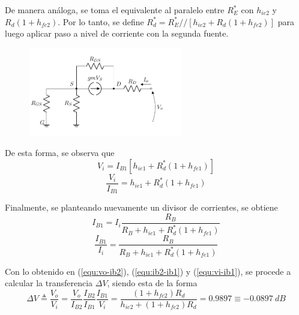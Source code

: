 De manera análoga, se toma el equivalente al paralelo entre $R_{E}^*$ con $h_{ie2}$ y $R_d \left( 1 + h_{fe2} \right)$. Por lo tanto, se define $R_{d}^* = R_{E}^* // \left[ h_{ie2} + R_d \left( 1 + h_{fe2} \right) \right]$ para luego aplicar paso a nivel de corriente con la segunda fuente.
\begin{figure}[H]
\centering
	\includegraphics[width=0.6\textwidth, page=6]{Imagenes/ModeloIncremental.pdf}
\end{figure}

De esta forma, se observa que
\begin{equation*}
	V_i = I_{B1} \left[ h_{ie1} + R_{d}^* \left( 1 + h_{fe1} \right) \right]
\end{equation*}
\begin{equation}
	\frac{V_i}{I_{B1}} = h_{ie1} + R_{d}^* \left( 1 + h_{fe1} \right)
	\label{equ:vi-ib1}
\end{equation}

Finalmente, se planteando nuevamente un divisor de corrientes, se obtiene
\begin{equation*}
	I_{B1} = I_i \frac{R_B}{R_B + h_{ie1} + R_{d}^* \left(1 + h_{fe1} \right)}
\end{equation*}
\begin{equation}
	\frac{I_{B1}}{I_i} = \frac{R_B}{R_B + h_{ie1} + R_{d}^* \left(1 + h_{fe1} \right)}
	\label{equ:ib1-ii}
\end{equation}

Con lo obtenido en (\ref{equ:vo-ib2}), (\ref{equ:ib2-ib1}) y (\ref{equ:vi-ib1}), se procede a calcular la transferencia $\Delta V$, siendo esta de la forma
\begin{equation}
	\Delta V \triangleq \frac{V_o}{V_i} = \frac{V_o}{I_{B2}} \frac{I_{B2}}{I_{B1}} \frac{I_{B1}}{V_i} = \frac{ \left( 1+h_{fe2} \right) R_d}{h_{ie2}+ \left( 1+h_{fe2} \right) R_d} = 0.9897 \equiv -0.0897 \ dB
\label{equ:Av}
\end{equation}


